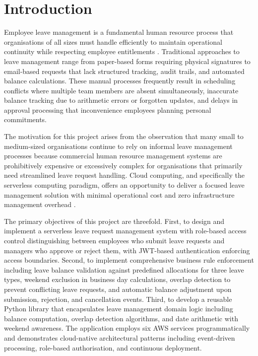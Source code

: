 \documentclass[conference]{IEEEtran}
\begin{document}
\section{Introduction}

Employee leave management is a fundamental human resource process that organisations of all sizes must handle efficiently to maintain operational continuity while respecting employee entitlements \cite{cloudpatterns}. Traditional approaches to leave management range from paper-based forms requiring physical signatures to email-based requests that lack structured tracking, audit trails, and automated balance calculations. These manual processes frequently result in scheduling conflicts where multiple team members are absent simultaneously, inaccurate balance tracking due to arithmetic errors or forgotten updates, and delays in approval processing that inconvenience employees planning personal commitments.

The motivation for this project arises from the observation that many small to medium-sized organisations continue to rely on informal leave management processes because commercial human resource management systems are prohibitively expensive or excessively complex for organisations that primarily need streamlined leave request handling. Cloud computing, and specifically the serverless computing paradigm, offers an opportunity to deliver a focused leave management solution with minimal operational cost and zero infrastructure management overhead \cite{serverless}.

The primary objectives of this project are threefold. First, to design and implement a serverless leave request management system with role-based access control distinguishing between employees who submit leave requests and managers who approve or reject them, with JWT-based authentication enforcing access boundaries. Second, to implement comprehensive business rule enforcement including leave balance validation against predefined allocations for three leave types, weekend exclusion in business day calculations, overlap detection to prevent conflicting leave requests, and automatic balance adjustment upon submission, rejection, and cancellation events. Third, to develop a reusable Python library that encapsulates leave management domain logic including balance computation, overlap detection algorithms, and date arithmetic with weekend awareness. The application employs six AWS services programmatically and demonstrates cloud-native architectural patterns including event-driven processing, role-based authorisation, and continuous deployment.
\end{document}

